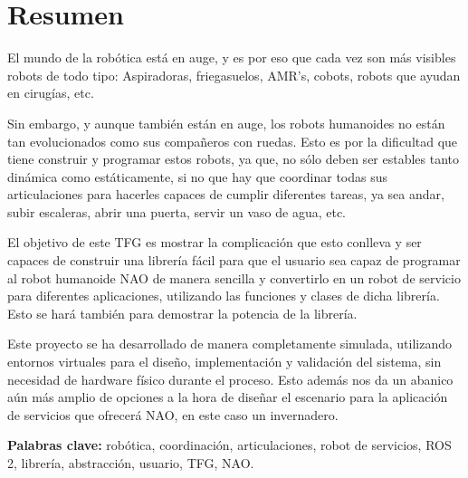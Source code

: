 \chapter*{Resumen}

El mundo de la robótica está en auge, y es por eso que cada vez son más visibles robots de todo tipo: Aspiradoras, friegasuelos, AMR's, cobots, robots que ayudan en cirugías, etc.

Sin embargo, y aunque también están en auge, los robots humanoides no están tan evolucionados como sus compañeros con ruedas. Esto es por la dificultad que tiene construir y programar estos robots, ya que, no sólo deben ser estables tanto dinámica como estáticamente, si no que hay que coordinar todas sus articulaciones para hacerles capaces de cumplir diferentes tareas, ya sea andar, subir escaleras, abrir una puerta, servir un vaso de agua, etc.

El objetivo de este TFG es mostrar la complicación que esto conlleva y ser capaces de construir una librería fácil para que el usuario sea capaz de programar al robot humanoide NAO de manera sencilla y convertirlo en un robot de servicio para diferentes aplicaciones, utilizando las funciones y clases de dicha librería. Esto se hará también para demostrar la potencia de la librería.

Este proyecto se ha desarrollado de manera completamente simulada, utilizando entornos virtuales para el diseño, implementación y validación del sistema, sin necesidad de hardware físico durante el proceso. Esto además nos da un abanico aún más amplio de opciones a la hora de diseñar el escenario para la aplicación de servicios que ofrecerá NAO, en este caso un invernadero.


\vspace{.5cm}

\textbf{Palabras clave:} robótica, coordinación, articulaciones, robot de servicios, ROS 2, librería, abstracción, usuario, TFG, NAO. 